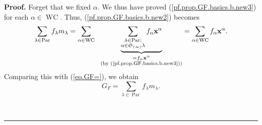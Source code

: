 \documentclass[numbers=enddot,12pt,final,onecolumn,notitlepage]{scrartcl}%
\theoremstyle{definition}
\newenvironment{proof}[1][Proof]{\noindent\textbf{#1.} }{\ \rule{0.5em}{0.5em}}
\let\sumnonlimits\sum
\renewcommand{\sum}{\sumnonlimits\limits}
\newenvironment{verlong}{}{}
\begin{document}
\begin{verlong}
\begin{proof}
Forget that we fixed $\alpha$. We thus have proved
(\ref{pf.prop.GF.basics.b.new3}) for each $\alpha\in\operatorname*{WC}$. Thus,
(\ref{pf.prop.GF.basics.b.new2}) becomes%
\[
\sum_{\lambda\in\operatorname*{Par}}f_{\lambda}m_{\lambda}=\sum_{\alpha
\in\operatorname*{WC}}\ \ \underbrace{\sum_{\substack{\lambda\in
\operatorname*{Par};\\\alpha\in\mathfrak{S}_{\left(  \infty\right)  }\lambda
}}f_{\alpha}\mathbf{x}^{\alpha}}_{\substack{=f_{\alpha}\mathbf{x}^{\alpha
}\\\text{(by (\ref{pf.prop.GF.basics.b.new3}))}}}=\sum_{\alpha\in
\operatorname*{WC}}f_{\alpha}\mathbf{x}^{\alpha}.
\]
Comparing this with (\ref{eq.GF=}), we obtain%
\begin{equation}
G_{F}=\sum_{\lambda\in\operatorname*{Par}}f_{\lambda}m_{\lambda}.
\label{pf.prop.GF.basics.b.2}%
\end{equation}



\end{proof}
\end{verlong}
\end{document}

